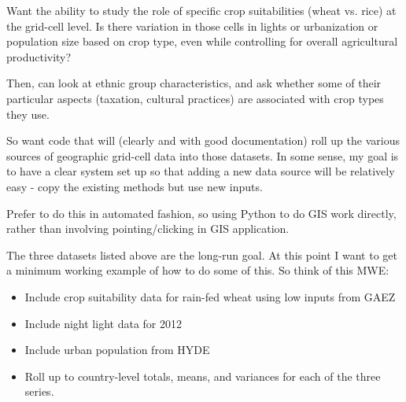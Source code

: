 \documentclass[10pt]{article}
\begin{document}
Want the ability to study the role of specific crop suitabilities (wheat vs. rice) at the grid-cell level. Is there variation in those cells in lights or urbanization or population size based on crop type, even while controlling for overall agricultural productivity?

Then, can look at ethnic group characteristics, and ask whether some of their particular aspects (taxation, cultural practices) are associated with crop types they use.

So want code that will (clearly and with good documentation) roll up the various sources of geographic grid-cell data into those datasets. In some sense, my goal is to have a clear system set up so that adding a new data source will be relatively easy - copy the existing methods but use new inputs. 

Prefer to do this in automated fashion, so using Python to do GIS work directly, rather than involving pointing/clicking in GIS application. 

The three datasets listed above are the long-run goal. At this point I want to get a minimum working example of how to do some of this. So think of this MWE:
\begin{itemize}
	\item Include crop suitability data for rain-fed wheat using low inputs from GAEZ
	\item Include night light data for 2012
	\item Include urban population from HYDE
	\item Roll up to country-level totals, means, and variances for each of the three series.
\end{itemize}
\end{document}
